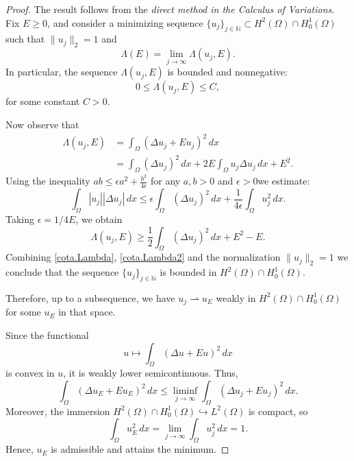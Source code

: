\documentclass[reprint,superscriptaddress,aps,prl]{revtex4-2}
\newcommand{\N}{\mathbb{N}}
\begin{document}
\begin{proof}
The result follows from the \emph{direct method in the Calculus of Variations}. Fix $E \ge 0$, and consider a minimizing sequence $\{u_j\}_{j \in \N} \subset H^2(\Omega) \cap H^1_0(\Omega)$ such that $\|u_j\|_2 = 1$ and
$$
\Lambda(E) = \lim_{j \to \infty} \Lambda(u_j, E).
$$
In particular, the sequence $\Lambda(u_j, E)$ is bounded and nonnegative:
\begin{equation}\label{cota.Lambda}
0 \le \Lambda(u_j, E) \le C,
\end{equation}
for some constant $C > 0$.

Now observe that
\begin{align*}
\Lambda(u_j, E) &= \int_\Omega (\Delta u_j + Eu_j)^2\, dx \\
&= \int_\Omega (\Delta u_j)^2\, dx + 2E\int_\Omega u_j \Delta u_j \, dx+ E^2.
\end{align*}
Using the inequality $ab\le \epsilon a^2 + \frac{b^2}{4\epsilon}$ for any $a, b>0$ and $\epsilon >0$we estimate:
$$
\int_\Omega |u_j| |\Delta u_j|\, dx \le \epsilon \int_\Omega (\Delta u_j)^2\, dx + \frac{1}{4\epsilon}\int_\Omega u_j^2\, dx.
$$
Taking $\epsilon=1/4E$, we obtain
\begin{equation}\label{cota.Lambda2}
\Lambda(u_j, E)\ge \frac12 \int_\Omega (\Delta u_j)^2\, dx + E^2-E.
\end{equation}
Combining \eqref{cota.Lambda}, \eqref{cota.Lambda2} and the normalization $\|u_j\|_2=1$ we conclude that the sequence $\{u_j\}_{j\in\N}$ is bounded in $H^2(\Omega)\cap H^1_0(\Omega)$.

Therefore, up to a subsequence, we have $u_j \rightharpoonup u_E$ weakly in $H^2(\Omega) \cap H^1_0(\Omega)$ for some $u_E$ in that space.

Since the functional 
$$
u \mapsto \int_\Omega (\Delta u + E u)^2\, dx
$$ 
is convex in $u$, it is weakly lower semicontinuous. Thus,
$$
\int_\Omega (\Delta u_E + E u_E)^2\, dx \le \liminf_{j \to \infty} \int_\Omega (\Delta u_j + E u_j)^2\, dx.
$$
Moreover, the immersion $H^2(\Omega)\cap H^1_0(\Omega)\hookrightarrow L^2(\Omega)$ is compact, so
$$
\int_\Omega u_E^2\, dx = \lim_{j\to\infty} \int_\Omega u_j^2\, dx = 1.
$$
Hence, $u_E$ is admissible and attains the minimum.
\end{proof}
\end{document}
